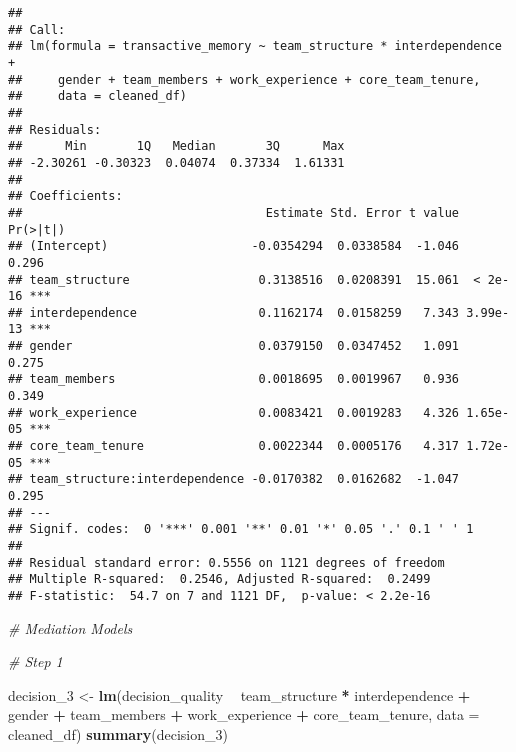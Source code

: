 \documentclass[]{article}
\newenvironment{Shaded}{\begin{snugshade}}{\end{snugshade}}
\newcommand{\CommentTok}[1]{\textcolor[rgb]{0.56,0.35,0.01}{\textit{#1}}}
\newcommand{\DataTypeTok}[1]{\textcolor[rgb]{0.13,0.29,0.53}{#1}}
\newcommand{\DecValTok}[1]{\textcolor[rgb]{0.00,0.00,0.81}{#1}}
\newcommand{\KeywordTok}[1]{\textcolor[rgb]{0.13,0.29,0.53}{\textbf{#1}}}
\newcommand{\NormalTok}[1]{#1}
\newcommand{\OperatorTok}[1]{\textcolor[rgb]{0.81,0.36,0.00}{\textbf{#1}}}
\newcommand{\StringTok}[1]{\textcolor[rgb]{0.31,0.60,0.02}{#1}}
\begin{document}
\begin{verbatim}
## 
## Call:
## lm(formula = transactive_memory ~ team_structure * interdependence + 
##     gender + team_members + work_experience + core_team_tenure, 
##     data = cleaned_df)
## 
## Residuals:
##      Min       1Q   Median       3Q      Max 
## -2.30261 -0.30323  0.04074  0.37334  1.61331 
## 
## Coefficients:
##                                  Estimate Std. Error t value Pr(>|t|)    
## (Intercept)                    -0.0354294  0.0338584  -1.046    0.296    
## team_structure                  0.3138516  0.0208391  15.061  < 2e-16 ***
## interdependence                 0.1162174  0.0158259   7.343 3.99e-13 ***
## gender                          0.0379150  0.0347452   1.091    0.275    
## team_members                    0.0018695  0.0019967   0.936    0.349    
## work_experience                 0.0083421  0.0019283   4.326 1.65e-05 ***
## core_team_tenure                0.0022344  0.0005176   4.317 1.72e-05 ***
## team_structure:interdependence -0.0170382  0.0162682  -1.047    0.295    
## ---
## Signif. codes:  0 '***' 0.001 '**' 0.01 '*' 0.05 '.' 0.1 ' ' 1
## 
## Residual standard error: 0.5556 on 1121 degrees of freedom
## Multiple R-squared:  0.2546, Adjusted R-squared:  0.2499 
## F-statistic:  54.7 on 7 and 1121 DF,  p-value: < 2.2e-16
\end{verbatim}

\begin{Shaded}
\begin{Highlighting}[]
\CommentTok{# Mediation Models}

\CommentTok{# Step 1}

\NormalTok{decision_}\DecValTok{3}\NormalTok{ <-}\StringTok{ }\KeywordTok{lm}\NormalTok{(decision_quality }\OperatorTok{~}\StringTok{ }\NormalTok{team_structure }\OperatorTok{*}\StringTok{ }\NormalTok{interdependence }\OperatorTok{+}\StringTok{ }\NormalTok{gender }\OperatorTok{+}\StringTok{ }\NormalTok{team_members }\OperatorTok{+}\StringTok{ }\NormalTok{work_experience }\OperatorTok{+}\StringTok{ }\NormalTok{core_team_tenure, }\DataTypeTok{data =}\NormalTok{ cleaned_df)}
\KeywordTok{summary}\NormalTok{(decision_}\DecValTok{3}\NormalTok{)}
\end{Highlighting}
\end{Shaded}
\end{document}
